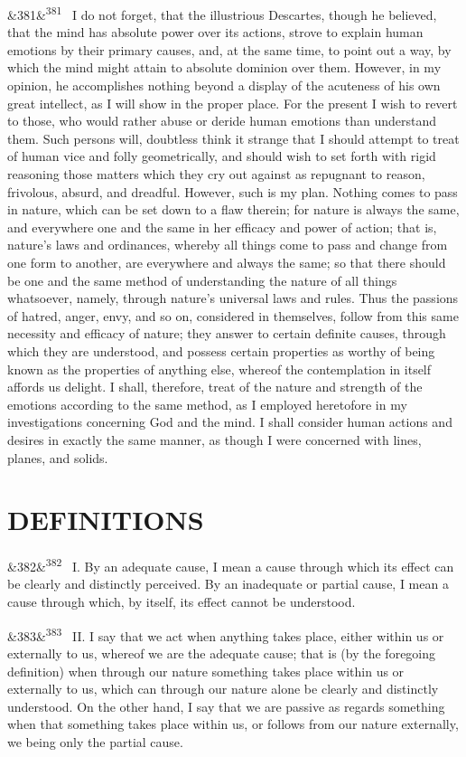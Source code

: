 \documentclass[12pt]{article}
\newcommand{\para}[1][]{\par\noindent\ifx&#1&\else\textsuperscript{\footnotesize #1}~\fi}
\begin{document}
\para[381] I do not forget, that the illustrious Descartes, though he believed, that the mind has absolute power over its actions, strove to explain human emotions by their primary causes, and, at the same time, to point out a way, by which the mind might attain to absolute dominion over them. However, in my opinion, he accomplishes nothing beyond a display of the acuteness of his own great intellect, as I will show in the proper place. For the present I wish to revert to those, who would rather abuse or deride human emotions than understand them. Such persons will, doubtless think it strange that I should attempt to treat of human vice and folly geometrically, and should wish to set forth with rigid reasoning those matters which they cry out against as repugnant to reason, frivolous, absurd, and dreadful. However, such is my plan. Nothing comes to pass in nature, which can be set down to a flaw therein; for nature is always the same, and everywhere one and the same in her efficacy and power of action; that is, nature's laws and ordinances, whereby all things come to pass and change from one form to another, are everywhere and always the same; so that there should be one and the same method of understanding the nature of all things whatsoever, namely, through nature's universal laws and rules. Thus the passions of hatred, anger, envy, and so on, considered in themselves, follow from this same necessity and efficacy of nature; they answer to certain definite causes, through which they are understood, and possess certain properties as worthy of being known as the properties of anything else, whereof the contemplation in itself affords us delight. I shall, therefore, treat of the nature and strength of the emotions according to the same method, as I employed heretofore in my investigations concerning God and the mind. I shall consider human actions and desires in exactly the same manner, as though I were concerned with lines, planes, and solids.

\section*{DEFINITIONS}

\para[382] I. By an adequate cause, I mean a cause through which its effect can be clearly and distinctly perceived. By an inadequate or partial cause, I mean a cause through which, by itself, its effect cannot be understood.

\para[383] II. I say that we act when anything takes place, either within us or externally to us, whereof we are the adequate cause; that is (by the foregoing definition) when through our nature something takes place within us or externally to us, which can through our nature alone be clearly and distinctly understood. On the other hand, I say that we are passive as regards something when that something takes place within us, or follows from our nature externally, we being only the partial cause.
\end{document}
